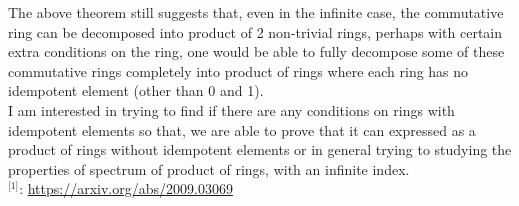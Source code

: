 \documentclass[11pt,a4paper]{colorart}
\begin{document}
The above theorem still suggests that, even in the infinite case, the commutative ring can be decomposed into product of 2 non-trivial rings, perhaps with certain extra conditions on the ring, one would be able to fully decompose some of these commutative rings completely into product of rings where each ring has no idempotent element (other than 0 and 1).\\

I am interested in trying to find if there are any conditions on rings with idempotent elements so that, we are able to prove that it can expressed as a product of rings without idempotent elements or in general trying to studying the properties of spectrum of product of rings, with an infinite index.\\


$^\text{[1]}$: \href{https://arxiv.org/abs/2208.08828}{https://arxiv.org/abs/2009.03069}
\end{document}
